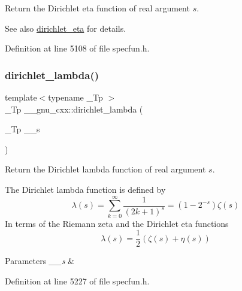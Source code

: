 Return the Dirichlet eta function of real argument $ s $.

\begin{DoxySeeAlso}{See also}
\hyperlink{group__gnu__math__spec__func_gae46e26e4107675d285c79a2d6202e6c7}{dirichlet\+\_\+eta} for details. 
\end{DoxySeeAlso}


Definition at line 5108 of file specfun.\+h.

\mbox{\label{group__gnu__math__spec__func_ga06842a81bdcabf9c62252dde992d42ee}} 
\subsubsection{\texorpdfstring{dirichlet\+\_\+lambda()}{dirichlet\_lambda()}}
{\footnotesize\ttfamily template$<$typename \+\_\+\+Tp $>$ \\
\+\_\+\+Tp \+\_\+\+\_\+gnu\+\_\+cxx\+::dirichlet\+\_\+lambda (\begin{DoxyParamCaption}\item[{\+\_\+\+Tp}]{\+\_\+\+\_\+s }\end{DoxyParamCaption})\hspace{0.3cm}{\ttfamily [inline]}}

Return the Dirichlet lambda function of real argument $ s $.

The Dirichlet lambda function is defined by \[ \lambda(s) = \sum_{k=0}^\infty \frac{1}{(2k+1)^s} = \left( 1 - 2^{-s} \right) \zeta(s) \] In terms of the Riemann zeta and the Dirichlet eta functions \[ \lambda(s) = \frac{1}{2}(\zeta(s) + \eta(s)) \]


\begin{DoxyParams}{Parameters}
{\em \+\_\+\+\_\+s} & \\
\hline
\end{DoxyParams}


Definition at line 5227 of file specfun.\+h.

\mbox{\label{group__gnu__math__spec__func_gaafd3ca6b0d71d55d3835536396eece8f}} 
